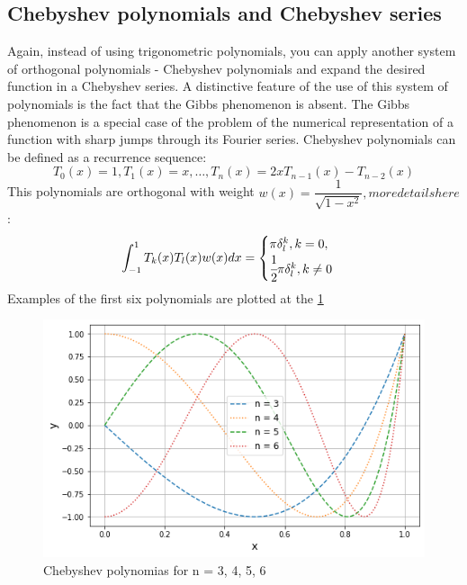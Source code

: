 \subsection{Chebyshev polynomials and Chebyshev series}
Again, instead of using trigonometric polynomials, you can apply another system of orthogonal polynomials - Chebyshev polynomials and expand the desired function in a Chebyshev series. A distinctive feature of the use of this system of polynomials is the fact that the Gibbs phenomenon is absent. The Gibbs phenomenon is a special case of the problem of the numerical representation of a function with sharp jumps through its Fourier series. Chebyshev polynomials can be defined as a recurrence sequence:
\begin{equation}
	T_0(x) = 1, T_1(x) = x, \dots, T_n(x) = 2 x T_{n - 1}(x) - T_{n - 2}(x)
\end{equation}
This polynomials are orthogonal with weight $w(x) = \dfrac{1}{\sqrt{1 - x^2}}, more details here$\cite{mason2002chebyshev}:
\begin{equation}
	\label{eq:chebyshev_series}
	\int_{-1}^{1} T_k(x) T_l(x) w(x) dx = \begin{cases}
		\pi \delta_l^k, k = 0, \\
		\cfrac{1}{2} \pi \delta_l^k, k \neq 0
	\end{cases}
\end{equation}
Examples of the first six polynomials are plotted at the \ref{fig:chebyshev_demo}
\begin{figure}[h]
	\centering
	\includegraphics[width=\textwidth]{images/chapter2/chebyshev_demo.png}
	\caption{Chebyshev polynomias for n = 3, 4, 5, 6}
	\label{fig:chebyshev_demo}
\end{figure}


